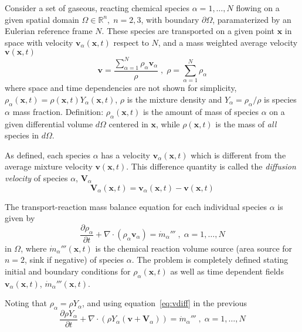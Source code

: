 \documentclass[12pt]{article}
\begin{document}
Consider a set of gaseous, reacting  chemical species $\alpha=1,\dots,N$ flowing on a given spatial domain $\Omega \in \mathbb{R}^n, \; n=2,3$, with boundary $\partial \Omega$, paramaterized by an Eulerian reference frame $N$. These species are transported on a given point $\mathbf{x}$ in space with velocity $\mathbf{v}_\alpha(\mathbf{x},t)$ respect to $N$, and a mass weighted average velocity $\mathbf{v}(\mathbf{x},t)$
%
\begin{equation}
  \mathbf{v} = \frac{ \sum\limits_{\alpha=1}^{N} {\rho_\alpha \mathbf{v}_\alpha}}{\rho} \; , \; \rho =  \sum\limits_{\alpha=1}^{N} {\rho_\alpha} \label{eq:veldens}
\end{equation}
%
where space and time dependencies are not shown for simplicity, $\rho_\alpha(\mathbf{x},t) = \rho(\mathbf{x},t) Y_\alpha (\mathbf{x},t)$, $\rho$ is the mixture density and $Y_\alpha = \rho_\alpha / \rho$ is species $\alpha$ mass fraction. Definition: $\rho_\alpha(\mathbf{x},t)$ is the amount of mass of species $\alpha$ on a given differential volume $d\Omega$ centered in $\mathbf{x}$, while  $\rho(\mathbf{x},t)$ is the mass of \textit{all} species in $d\Omega$.

As defined, each species $\alpha$ has a velocity $\mathbf{v}_\alpha(\mathbf{x},t)$ which is different from the average mixture velocity $\mathbf{v}(\mathbf{x},t)$. This difference quantity is called the \textit{diffusion velocity} of species $\alpha$, $\mathbf{V}_\alpha$
%
\begin{equation}
   \mathbf{V}_\alpha(\mathbf{x},t) = \mathbf{v}_\alpha(\mathbf{x},t) - \mathbf{v}(\mathbf{x},t) \label{eq:vdiff}
\end{equation}
%

The transport-reaction mass balance equation for each individual species $\alpha$ is given by
%
\begin{equation}
   \frac{\partial \rho_\alpha}{ \partial t} + \nabla \cdot (\rho_\alpha  \mathbf{v}_\alpha) = \dot{m}_\alpha''' \; , \; \alpha=1,\dots,N \label{eq:bal}
\end{equation}
% 
in $\Omega$, where $\dot{m}_\alpha'''(\mathbf{x},t)$ is the chemical reaction volume source (area source for $n=2$, sink if negative) of species $\alpha$. The problem is completely defined stating initial and boundary conditions for $\rho_\alpha(\mathbf{x},t)$ as well as time dependent fields $\mathbf{v}_\alpha(\mathbf{x},t)$, $\dot{m}_\alpha'''(\mathbf{x},t)$.

Noting that $ \rho_\alpha = \rho Y_\alpha$, and using equation~\eqref{eq:vdiff} in the previous
%
\begin{equation}
   \frac{\partial \rho Y_\alpha}{ \partial t} + \nabla \cdot \left( \rho Y_\alpha  (\mathbf{v}+\mathbf{V}_\alpha) \right) = \dot{m}_\alpha''' \; , \; \alpha=1,\dots,N \label{eq:bal2}
\end{equation} 
%
\end{document}
